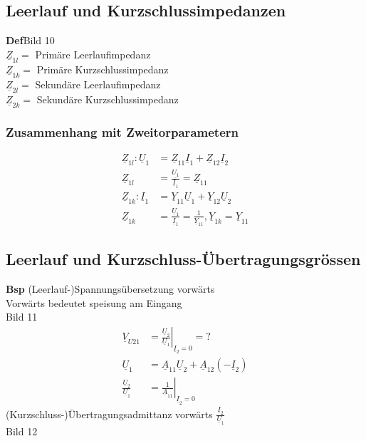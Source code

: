 \subsection{Leerlauf und Kurzschlussimpedanzen}
\textbf{Def}Bild 10\\
$\underline{Z}_{1l}=$ Primäre Leerlaufimpedanz\\
$\underline{Z}_{1k}=$ Primäre Kurzschlussimpedanz\\
$\underline{Z}_{2l}=$ Sekundäre Leerlaufimpedanz\\
$\underline{Z}_{2k}=$ Sekundäre Kurzschlussimpedanz\\
\subsubsection{Zusammenhang mit Zweitorparametern}
\begin{align}
	\underline{Z}_{1l}:
	\underline{U}_1&=\underline{Z}_11\underline{I}_1+\underline{Z}_{12}\underline{I}_2\nonumber\\
	\underline{Z}_{1l}&=\frac{\underline{U_1}}{\underline{I}_1}=\underline{Z}_{11}\nonumber\\
	\underline{Z}_{1k}:
	\underline{I}_1&=\underline{Y}_{11}\underline{U}_1+\underline{Y}_{12}\underline{U}_2\nonumber\\
	\underline{Z}_{1k}&=\frac{\underline{U}_1}{\underline{I}_1}=\frac{1}{\underline{Y}_{11}},
	\underline{Y}_{1k}=\underline{Y}_{11}\nonumber
\end{align}
\subsection{Leerlauf und Kurzschluss-Übertragungsgrössen}
\textbf{Bsp} (Leerlauf-)Spannungsübersetzung vorwärts\\
Vorwärts bedeutet speisung am Eingang\\
Bild 11\\
\begin{align}
	\underline{V}_{U21}&=\left.\frac{\underline{U}_2}{\underline{U}_1}\right|_{\underline{I}_2=0}=?\nonumber\\
	\underline{U}_1&=\underline{A}_{11}\underline{U}_{2}+\underline{A}_{12}\left(-\underline{I}_2\right)\nonumber\\
	\frac{\underline{U}_2}{\underline{U}_1}&=\left.\frac{1}{\underline{A}_11}\right|_{\underline{I}_2=0}\nonumber
\end{align}
(Kurzschluss-)Übertragungsadmittanz vorwärts
$\frac{\underline{I}_2}{\underline{U}_1}$\\
Bild 12\\